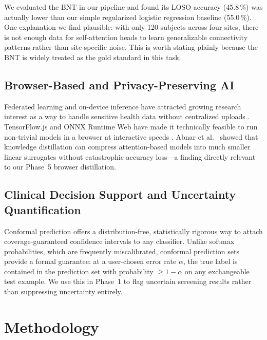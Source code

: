 \documentclass[conference]{IEEEtran}
\begin{document}
We evaluated the BNT in our pipeline and found its LOSO accuracy
(45.8\,\%) was actually lower than our simple regularized logistic
regression baseline (55.0\,\%). One explanation we find plausible: with
only 120 subjects across four sites, there is not enough data for
self-attention heads to learn generalizable connectivity patterns rather
than site-specific noise. This is worth stating plainly because the
BNT is widely treated as the gold standard in this task.

\subsection{Browser-Based and Privacy-Preserving AI}

Federated learning and on-device inference have attracted growing
research interest as a way to handle sensitive health data without
centralized uploads \cite{rieke2020}. TensorFlow.js and ONNX Runtime
Web have made it technically feasible to run non-trivial models in a
browser at interactive speeds \cite{onnxruntime2023}. Abnar et al.\
\cite{abnar2020} showed that knowledge distillation can compress
attention-based models into much smaller linear surrogates without
catastrophic accuracy loss---a finding directly relevant to our
Phase~5 browser distillation.

\subsection{Clinical Decision Support and Uncertainty Quantification}

Conformal prediction \cite{angelopoulos2023} offers a distribution-free,
statistically rigorous way to attach coverage-guaranteed confidence
intervals to any classifier. Unlike softmax probabilities, which are
frequently miscalibrated, conformal prediction sets provide a formal
guarantee: at a user-chosen error rate $\alpha$, the true label is
contained in the prediction set with probability $\geq 1 - \alpha$ on
any exchangeable test example. We use this in Phase~1 to flag uncertain
screening results rather than suppressing uncertainty entirely.

\section{Methodology}
\end{document}
